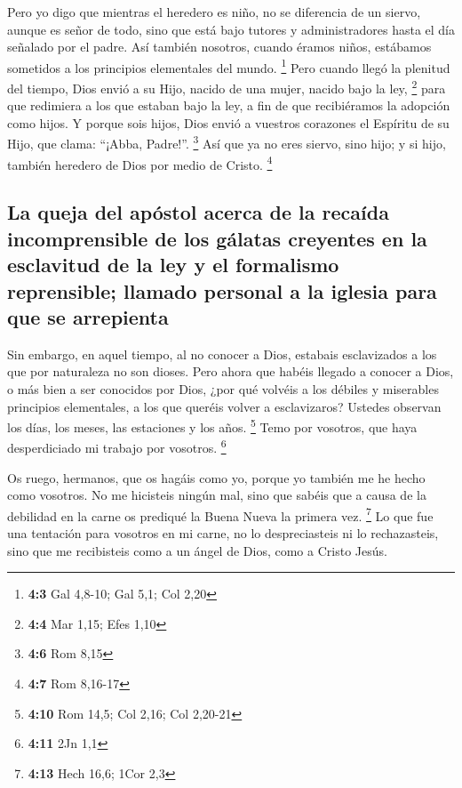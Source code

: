\begin{paracol}{2}
 Pero yo digo que mientras el heredero es niño, no se
diferencia de un siervo, aunque es señor de todo,  sino
que está bajo tutores y administradores hasta el día señalado por el
padre.  Así también nosotros, cuando éramos niños,
estábamos sometidos a los principios elementales del mundo. \footnote{\textbf{4:3}
  Gal 4,8-10; Gal 5,1; Col 2,20}  Pero cuando llegó la
plenitud del tiempo, Dios envió a su Hijo, nacido de una mujer, nacido
bajo la ley, \footnote{\textbf{4:4} Mar 1,15; Efes 1,10} 
para que redimiera a los que estaban bajo la ley, a fin de que
recibiéramos la adopción como hijos.  Y porque sois hijos,
Dios envió a vuestros corazones el Espíritu de su Hijo, que clama:
``¡Abba, Padre!''. \footnote{\textbf{4:6} Rom 8,15}  Así
que ya no eres siervo, sino hijo; y si hijo, también heredero de Dios
por medio de Cristo. \footnote{\textbf{4:7} Rom 8,16-17}

\hypertarget{la-queja-del-apuxf3stol-acerca-de-la-recauxedda-incomprensible-de-los-guxe1latas-creyentes-en-la-esclavitud-de-la-ley-y-el-formalismo-reprensible-llamado-personal-a-la-iglesia-para-que-se-arrepienta}{%
\subsection{La queja del apóstol acerca de la recaída incomprensible de
los gálatas creyentes en la esclavitud de la ley y el formalismo
reprensible; llamado personal a la iglesia para que se
arrepienta}\label{la-queja-del-apuxf3stol-acerca-de-la-recauxedda-incomprensible-de-los-guxe1latas-creyentes-en-la-esclavitud-de-la-ley-y-el-formalismo-reprensible-llamado-personal-a-la-iglesia-para-que-se-arrepienta}}

 Sin embargo, en aquel tiempo, al no conocer a Dios,
estabais esclavizados a los que por naturaleza no son dioses.
 Pero ahora que habéis llegado a conocer a Dios, o más
bien a ser conocidos por Dios, ¿por qué volvéis a los débiles y
miserables principios elementales, a los que queréis volver a
esclavizaros?  Ustedes observan los días, los meses, las
estaciones y los años. \footnote{\textbf{4:10} Rom 14,5; Col 2,16; Col
  2,20-21}  Temo por vosotros, que haya desperdiciado mi
trabajo por vosotros. \footnote{\textbf{4:11} 2Jn 1,1}

 Os ruego, hermanos, que os hagáis como yo, porque yo
también me he hecho como vosotros. No me hicisteis ningún mal,
 sino que sabéis que a causa de la debilidad en la carne
os prediqué la Buena Nueva la primera vez. \footnote{\textbf{4:13} Hech
  16,6; 1Cor 2,3}  Lo que fue una tentación para vosotros
en mi carne, no lo despreciasteis ni lo rechazasteis, sino que me
recibisteis como a un ángel de Dios, como a Cristo Jesús.


\end{paracol}
